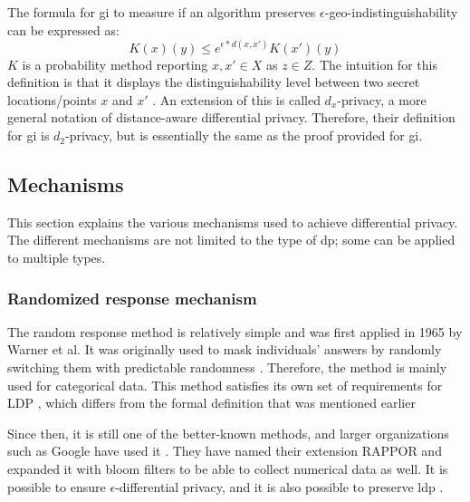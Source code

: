 The formula for \gls{gi} to measure if an algorithm preserves $\epsilon$-geo-indistinguishability can be expressed as:
\begin{equation}
  K(x)(y) \le e^{\epsilon * d(x,x')} K(x')(y)
  \label{algo:2d-geo-indistinguishability}
\end{equation}
$K$ is a probability method reporting $x, x' \in X$ as $z \in Z$.
The intuition for this definition is that it displays the distinguishability level between two secret locations/points $x$ and $x'$ \citep{chatzikokolakis_constructing_2015}.
An extension of this is called $d_x$-privacy, a more general notation of distance-aware differential privacy.
Therefore, their definition for \gls{gi} is $d_2$-privacy, but is essentially the same as the proof provided for \gls{gi}.
\newpage
\subsection{Mechanisms}
This section explains the various mechanisms used to achieve differential privacy.
The different mechanisms are not limited to the type of \gls{dp}; some can be applied to multiple types.
\subsubsection{Randomized response mechanism}
The random response method is relatively simple and was first applied in 1965 by Warner et al.
It was originally used to mask individuals' answers by randomly switching them with predictable randomness \citep{warner_randomized_1965}.
Therefore, the method is mainly used for categorical data.
This method satisfies its own set of requirements for LDP \citep{del_rey_comprehensive_2020}, which differs from the formal definition that was mentioned earlier

Since then, it is still one of the better-known methods, and larger organizations such as Google have used it \citep{erlingsson_rappor_2014}.
They have named their extension RAPPOR and expanded it with bloom filters to be able to collect numerical data as well.
It is possible to ensure $\epsilon$-differential privacy, and it is also possible to preserve \gls{ldp} \citep{del_rey_comprehensive_2020}.
